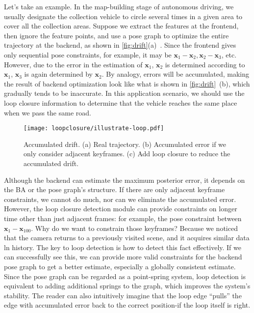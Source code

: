 Let's take an example. In the map-building stage of autonomous driving, we usually designate the collection vehicle to circle several times in a given area to cover all the collection areas. Suppose we extract the features at the frontend, then ignore the feature points, and use a pose graph to optimize the entire trajectory at the backend, as shown in \autoref{fig:drift}(a)~. Since the frontend gives only sequential pose constraints, for example, it may be $\mathbf{x}_1-\mathbf{x}_2, \mathbf{x}_2-\mathbf{x}_3$, etc. However, due to the error in the estimation of $\mathbf{x}_1$, $\mathbf{x}_2$ is determined according to $\mathbf{x}_1$, $\mathbf{x}_3$ is again determined by $ \mathbf{x}_2$. By analogy, errors will be accumulated, making the result of backend optimization look like what is shown in \autoref{fig:drift}~(b), which gradually tends to be inaccurate. In this application scenario, we should use the loop closure information to determine that the vehicle reaches the same place when we pass the same road.

\begin{figure}[!htp]
	\centering
	\texttt{[image: loopclosure/illustrate-loop.pdf]}
	\caption{Accumulated drift. (a) Real trajectory. (b) Accumulated error if we only consider adjacent keyframes. (c) Add loop closure to reduce the accumulated drift. }
	\label{fig:drift}
\end{figure}

Although the backend can estimate the maximum posterior error, it depends on the BA or the pose graph's structure. If there are only adjacent keyframe constraints, we cannot do much, nor can we eliminate the accumulated error. However, the loop closure detection module can provide constraints on longer time other than just adjacent frames: for example, the pose constraint between $\mathbf{x}_1-\mathbf{x}_{100}$. Why do we want to constrain those keyframes? Because we noticed that the camera returns to a previously visited scene, and it acquires similar data ln history. The key to loop detection is how to detect this fact effectively. If we can successfully see this, we can provide more valid constraints for the backend pose graph to get a better estimate, especially a globally consistent estimate. Since the pose graph can be regarded as a point-spring system, loop detection is equivalent to adding additional springs to the graph, which improves the system's stability. The reader can also intuitively imagine that the loop edge ``pulls'' the edge with accumulated error back to the correct position-if the loop itself is right.


